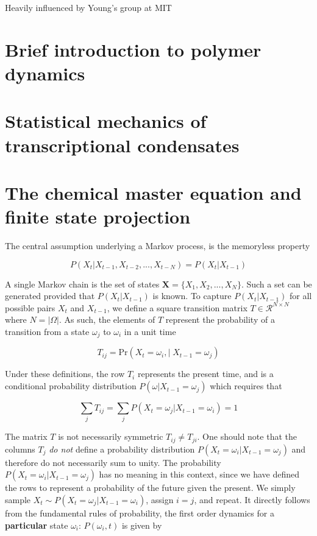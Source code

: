 \documentclass{ucetd}
\begin{document}
Heavily influenced by Young's group at MIT


\section{Brief introduction to polymer dynamics}

\section{Statistical mechanics of transcriptional condensates}

\section{The chemical master equation and finite state projection}

The central assumption underlying a Markov process, is the memoryless property

\begin{equation*}
P(X_{t}|X_{t-1}, X_{t-2}, ..., X_{t-N}) = P(X_{t}|X_{t-1})
\end{equation*}

A single Markov chain is the set of states $\bm{X} = \{X_{1},X_{2},...,X_{N}\}$. Such a set can be generated provided that $P(X_{t}|X_{t-1})$ is known. To capture $P(X_{t}|X_{t-1})$ for all possible pairs $X_{t}$ and $X_{t-1}$, we define a square transition matrix $T\in \mathcal{R}^{N\times N}$ where $N = |\Omega|$. As such, the elements of $T$ represent the probability of a transition from a state $\omega_{j}$ to $\omega_{i}$ in a unit time

\begin{equation*}
T_{ij} = \mathrm{Pr}\left(X_{t}=\omega_{i}, | \;X_{t-1}=\omega_{j}\right)
\end{equation*}

Under these definitions, the row $T_{i}$ represents the present time, and is a conditional  probability distribution $P(\omega | X_{t-1} = \omega_{j})$ which requires that

\begin{equation*}
\sum_{j}T_{ij} = \sum_{j} P(X_{t} = \omega_{j} | X_{t-1} = \omega_{i}) = 1
\end{equation*}

The matrix $T$ is not necessarily symmetric $T_{ij} \neq T_{ji}$. One should note that the columns $T_{j}$ \emph{do not} define a probability distribution $P(X_{t} = \omega_{i} | X_{t-1} = \omega_{j})$ and therefore do not necessarily sum to unity. The probability $P(X_{t} = \omega_{i} | X_{t-1} = \omega_{j})$ has no meaning in this context, since we have defined the rows to represent a probability of the future given the present. We simply sample $X_{t} \sim P(X_{t} = \omega_{j} | X_{t-1} = \omega_{i})$, assign $i=j$, and repeat. It directly follows from the fundamental rules of probability, the first order dynamics for a \textbf{particular} state $\omega_{i}$: $P(\omega_{i},t)$ is given by
\end{document}
